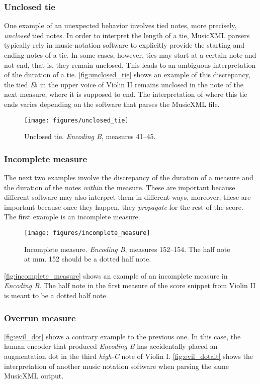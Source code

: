 \subsubsection{Unclosed tie}
One example of an unexpected behavior involves tied notes, more precisely, \emph{unclosed} tied notes. In order to interpret the length of a tie, MusicXML parsers typically rely in music notation software to explicitly provide the starting and ending notes of a tie. In some cases, however, ties may start at a certain note and not end, that is, they remain unclosed. This leads to an ambiguous interpretation of the duration of a tie. \autoref{fig:unclosed_tie} shows an example of this discrepancy, the tied \emph{E$\flat$} in the upper voice of Violin II remains unclosed in the note of the next measure, where it is supposed to end. The interpretation of where this tie ends varies depending on the software that parses the MusicXML file.

\begin{figure}[h]
\texttt{[image: figures/unclosed\_tie]}
\caption{Unclosed tie. \emph{Encoding B}, measures 41--45.}
\label{fig:unclosed_tie}
\end{figure}

\subsubsection{Incomplete measure}
The next two examples involve the discrepancy of the duration of a measure and the duration of the notes \emph{within} the measure. These are important because different software may also interpret them in different ways, moreover, these are important because once they happen, they \emph{propagate} for the rest of the score. The first example is an incomplete measure.

\begin{figure}[h]
\texttt{[image: figures/incomplete\_measure]}
\caption{Incomplete measure. \emph{Encoding B}, measures 152--154. The half note at mm. 152 should be a dotted half note.}
\label{fig:incomplete_measure}
\end{figure}


\autoref{fig:incomplete_measure} shows an example of an incomplete measure in \emph{Encoding B}. The half note in the first measure of the score snippet from Violin II is meant to be a dotted half note.

\subsubsection{Overrun measure}
\autoref{fig:evil_dot} shows a contrary example to the previous one. In this case, the human encoder that produced \emph{Encoding B} has accidentally placed an augmentation dot in the third \emph{high-C} note of Violin I. \autoref{fig:evil_dotalt} shows the interpretation of another music notation software when parsing the same MusicXML output.

